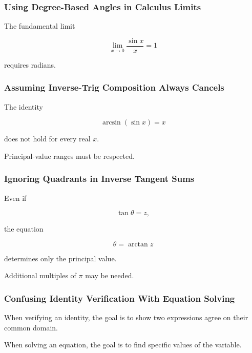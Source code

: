 \subsubsection{Using Degree-Based Angles in Calculus Limits}

The fundamental limit

\[
\boxed{
\lim_{x\to0}
\frac{\sin x}{x}
=
1
}
\]

requires radians.

\subsubsection{Assuming Inverse-Trig Composition Always Cancels}

The identity

\[
\arcsin(\sin x)=x
\]

does not hold for every real \(x\).

Principal-value ranges must be respected.

\subsubsection{Ignoring Quadrants in Inverse Tangent Sums}

Even if

\[
\tan\theta
=
z,
\]

the equation

\[
\theta=\arctan z
\]

determines only the principal value.

Additional multiples of \(\pi\) may be needed.

\subsubsection{Confusing Identity Verification With Equation Solving}

When verifying an identity, the goal is to show two expressions agree on
their common domain.

When solving an equation, the goal is to find specific values of the
variable.

